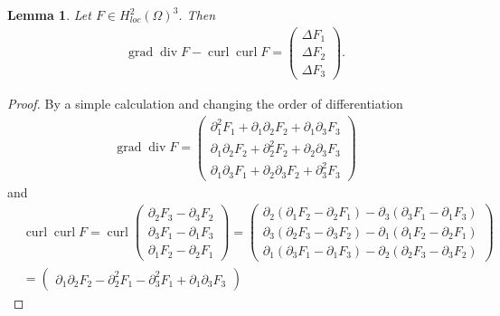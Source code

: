 \documentclass[12pt,a4paper]{article}
\numberwithin{equation}{subsection}
\newtheorem{lemma}{Lemma}[section]
\numberwithin{lemma}{subsection}
\theoremstyle{definition}
\DeclareMathOperator{\curl}{curl}
\DeclareMathOperator{\diver}{div}
\DeclareMathOperator{\grad}{grad}
\begin{document}
\begin{lemma}\label{lem:graddiv_curlcurl_equals_componentwise_laplacian}
    Let $F \in H^2_{loc}(\Omega)^3$. Then 
    \begin{align*}
        \grad \diver F - \curl \curl F 
        = \begin{pmatrix} \Delta F_1 \\ \Delta F_2 
            \\ \Delta F_3  \end{pmatrix}.
    \end{align*}
\end{lemma}
\begin{proof}
    By a simple calculation and changing the order of differentiation
    \begin{align*}
        \grad \diver F = 
            \begin{pmatrix} \partial_1^2 F_1 + \partial_1 \partial_2 F_2
                + \partial_1 \partial_3 F_3
            \\ \partial_1\partial_2 F_2 + \partial_2^2 F_2 + 
                \partial_2\partial_3 F_3
            \\ \partial_1 \partial_3 F_1 + \partial_2\partial_3 F_2
                + \partial_3^2 F_3
            \end{pmatrix}
    \end{align*}
    and 
    \begin{align*}
        &\curl \curl F = \curl \begin{pmatrix} 
            \partial_2 F_3 - \partial_3 F_2 \\ \partial_3 F_1 - \partial_1 F_3 
            \\ \partial_1 F_2 - \partial_2 F_1  \end{pmatrix}
        = \begin{pmatrix} 
            \partial_2 (\partial_1 F_2 - \partial_2 F_1)
                - \partial_3 (\partial_3 F_1 - \partial_1 F_3)
            \\ \partial_3 (\partial_2 F_3 - \partial_3 F_2)
                - \partial_1 (\partial_1 F_2 - \partial_2 F_1)
            \\ \partial_1 (\partial_3 F_1 - \partial_1 F_3)
                - \partial_2 (\partial_2 F_3 - \partial_3 F_2)  
            \end{pmatrix}
        \\ &= \begin{pmatrix}
            \partial_1 \partial_2 F_2 - \partial^2_2 F_1 - \partial_3^2 F_1
            + \partial_1 \partial_3 F_3 

\end{pmatrix}
\end{align*}
\end{proof}
\end{document}
